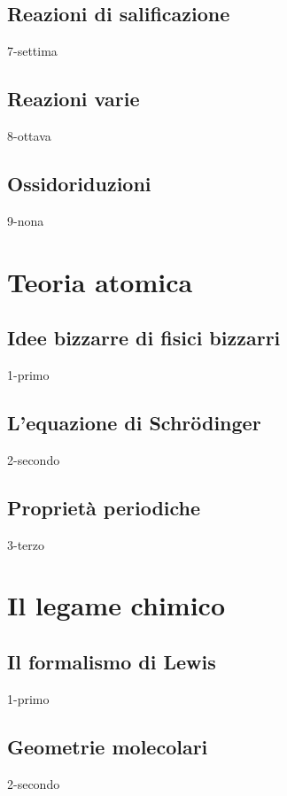 \documentclass[openany,12pt]{book}%
\begin{document}
\section{Reazioni di salificazione}
{7-settima}

\section{Reazioni varie}
{8-ottava}

\section{Ossidoriduzioni}
{9-nona}

\chapter{Teoria atomica}

\section{Idee bizzarre di fisici bizzarri}
{1-primo}

\section{L'equazione di Schrödinger}
{2-secondo}

\newpage

\section{Proprietà periodiche}
{3-terzo}

\chapter{Il legame chimico}

\section{Il formalismo di Lewis}
{1-primo}

\newpage

\section{Geometrie molecolari}
{2-secondo}
\end{document}
